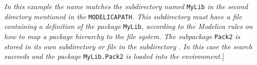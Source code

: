 \emph{In this example the name matches the subdirectory named} \lstinline!MyLib!
\emph{in the second directory} 
\emph{mentioned in the} \lstinline!MODELICAPATH!\emph{. This subdirectory must have
a file}  \emph{containing a definition of the package}
\lstinline!MyLib!\emph{, according to the Modelica rules on how to map a package
hierarchy to the file system. The subpackage} \lstinline!Pack2! \emph{is stored in
its own subdirectory or file in the subdirectory} \emph{. In this
case the search succeeds and the package} \lstinline!MyLib.Pack2! \emph{is loaded
into the environment.}{]}
